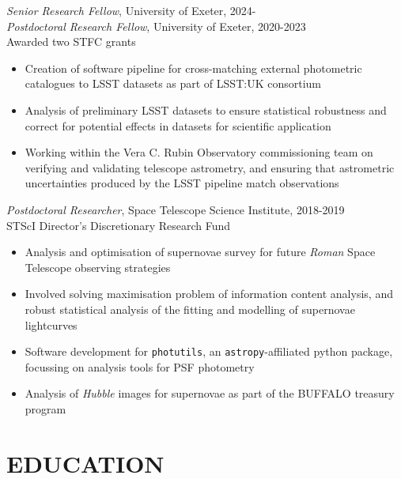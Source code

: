 \documentclass[letter, margin, 10pt]{res} %
\begin{document}
\begin{resume}
{\sl Senior Research Fellow}, University of Exeter, 2024-\\
{\sl Postdoctoral Research Fellow}, University of Exeter, 2020-2023\\
\null\quad\quad Awarded two STFC grants
\begin{itemize}[noitemsep,topsep=0pt,parsep=0pt,partopsep=0pt]
\item Creation of software pipeline for cross-matching external photometric catalogues to LSST datasets as part of LSST:UK consortium
\item Analysis of preliminary LSST datasets to ensure statistical robustness and correct for potential effects in datasets for scientific application
\item Working within the Vera C. Rubin Observatory commissioning team on verifying and validating telescope astrometry, and ensuring that astrometric uncertainties produced by the LSST pipeline match observations
\end{itemize}
\vspace{-10pt}
{\sl Postdoctoral Researcher}, Space Telescope Science Institute, 2018-2019\\
\null\quad\quad STScI Director's Discretionary Research Fund
\begin{itemize}[noitemsep,topsep=0pt,parsep=0pt,partopsep=0pt]
\item Analysis and optimisation of supernovae survey for future \textit{Roman} Space Telescope observing strategies
\item Involved solving maximisation problem of information content analysis, and robust statistical analysis of the fitting and modelling of supernovae lightcurves
\item Software development for \texttt{photutils}, an \texttt{astropy}-affiliated python package, focussing on analysis tools for PSF photometry
\item Analysis of \textit{Hubble} images for supernovae as part of the BUFFALO treasury program
\end{itemize}
\vspace{-5pt}
\section{EDUCATION}


\end{resume}
\end{document}
